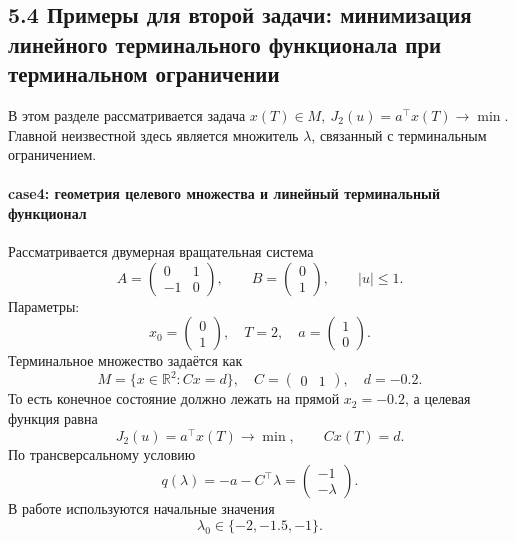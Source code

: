\documentclass[a4paper,12pt]{article}
\begin{document}
\subsection{5.4 Примеры для второй задачи: минимизация линейного терминального функционала при терминальном ограничении}

В этом разделе рассматривается задача $x(T)\in M,\ J_2(u)=a^\top x(T)\to\min$. Главной неизвестной здесь является множитель $\lambda$, связанный с терминальным ограничением.

\paragraph{case4: геометрия целевого множества и линейный терминальный функционал}
Рассматривается двумерная вращательная система
\[
A=
\begin{pmatrix}
0&1\\
-1&0
\end{pmatrix},
\qquad
B=
\begin{pmatrix}
0\\
1
\end{pmatrix},
\qquad |u|\leq 1.
\]
Параметры:
\[
x_0=
\begin{pmatrix}
0\\
1
\end{pmatrix},
\quad
T=2,
\quad
a=
\begin{pmatrix}
1\\
0
\end{pmatrix}.
\]
Терминальное множество задаётся как
\[
M=\{x\in\mathbb{R}^2:Cx=d\},
\quad
C=
\begin{pmatrix}
0&1
\end{pmatrix},
\quad
d=-0.2.
\]
То есть конечное состояние должно лежать на прямой $x_2=-0.2$, а целевая функция равна
\[
J_2(u)=a^\top x(T)\to\min,\qquad Cx(T)=d.
\]
По трансверсальному условию
\[
q(\lambda)=-a-C^\top\lambda=
\begin{pmatrix}
-1\\
-\lambda
\end{pmatrix}.
\]
В работе используются начальные значения
\[
\lambda_0\in\{-2,-1.5,-1\}.
\]
\end{document}
